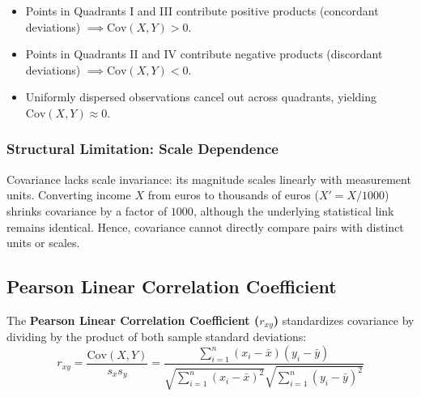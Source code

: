 \begin{itemize}
    \item Points in Quadrants I and III contribute positive products (concordant deviations) $\implies \text{Cov}(X, Y) > 0$.
    \item Points in Quadrants II and IV contribute negative products (discordant deviations) $\implies \text{Cov}(X, Y) < 0$.
    \item Uniformly dispersed observations cancel out across quadrants, yielding $\text{Cov}(X, Y) \approx 0$.
\end{itemize}

\subsubsection{Structural Limitation: Scale Dependence}
Covariance lacks scale invariance: its magnitude scales linearly with measurement units. Converting income $X$ from euros to thousands of euros ($X' = X / 1000$) shrinks covariance by a factor of $1000$, although the underlying statistical link remains identical. Hence, covariance cannot directly compare pairs with distinct units or scales.

\subsection{Pearson Linear Correlation Coefficient}

The \textbf{Pearson Linear Correlation Coefficient ($r_{xy}$)} standardizes covariance by dividing by the product of both sample standard deviations:
\begin{equation}
    r_{xy} = \frac{\text{Cov}(X, Y)}{s_x s_y} = \frac{\sum_{i=1}^n (x_i - \bar{x})(y_i - \bar{y})}{\sqrt{\sum_{i=1}^n (x_i - \bar{x})^2} \sqrt{\sum_{i=1}^n (y_i - \bar{y})^2}}
\end{equation}

